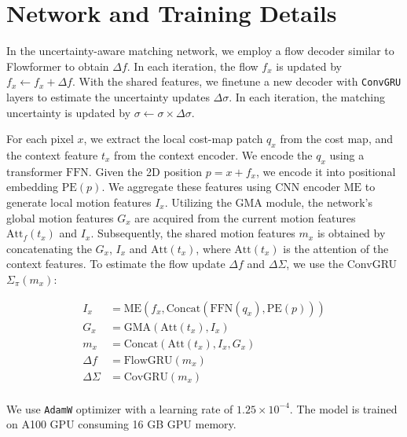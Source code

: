 % 

\section{Network and Training Details}
\label{sec:macvo:Network}

In the uncertainty-aware matching network, we employ a flow decoder similar to Flowformer to obtain $\Delta f$. 
In each iteration, the flow $f_x$ is updated by $f_x \leftarrow f_x + \Delta f$.
With the shared features, we finetune a new decoder with \texttt{ConvGRU} layers to estimate the uncertainty updates $\Delta \sigma$.
In each iteration, the matching uncertainty is updated by $\sigma \leftarrow \sigma \times \Delta \sigma$. 

For each pixel $x$, we extract the local cost-map patch $q_x$ from the cost map, and the context feature $t_x$ from the context encoder.
We encode the $q_x$ using a transformer $\text{FFN}$.
Given the 2D position $p = x + f_x $, we encode it into positional embedding $\text{PE}(p)$.
We aggregate these features using CNN encoder $\text{ME}$ to generate local motion features ${I_x}$.
Utilizing the GMA module, the network's global motion features $G_x$ are acquired from the current motion features $\text{Att}_f(t_x)$ and ${I_x}$. 
Subsequently, the shared motion features $m_x$ is obtained by concatenating the $G_x$, $I_x$ and $\text{Att}(t_x)$, where $\text{Att}(t_x)$ is the attention of the context features.
To estimate the flow update $\Delta f$ and $\Delta \Sigma$, we use the ConvGRU $\Sigma_\pi (m_x)$:

\begin{equation}
\begin{aligned}
        I_x &= \text{ME}(f_x, \text{Concat}(\text{FFN}(q_x), \text{PE}(p))) \\
    G_x&=\text{GMA}(\text{Att}(t_x), {I_x}) \\
    m_x &= \text{Concat}(\text{Att}(t_x), {I_x}, G_x) \\
    \Delta f&=\text{FlowGRU}(m_x) \\
    \Delta \Sigma&=\text{CovGRU}(m_x) \\
\end{aligned}
\end{equation}

We use \texttt{AdamW} optimizer with a learning rate of $1.25 \times 10^{-4}$. The model is trained on A100 GPU consuming 16 GB GPU memory.

